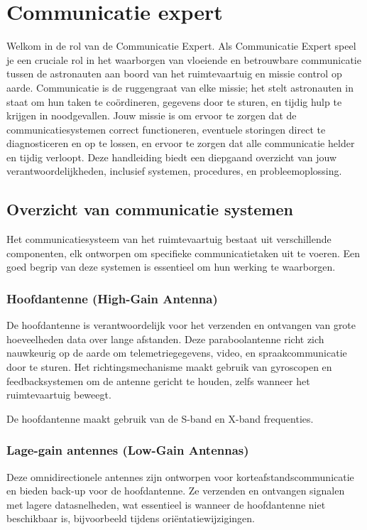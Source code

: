 \section{Communicatie expert}

Welkom in de rol van de Communicatie Expert. Als Communicatie Expert speel je een cruciale rol in het waarborgen van vloeiende en betrouwbare communicatie tussen de astronauten aan boord van het ruimtevaartuig en missie control op aarde. Communicatie is de ruggengraat van elke missie; het stelt astronauten in staat om hun taken te coördineren, gegevens door te sturen, en tijdig hulp te krijgen in noodgevallen. Jouw missie is om ervoor te zorgen dat de communicatiesystemen correct functioneren, eventuele storingen direct te diagnosticeren en op te lossen, en ervoor te zorgen dat alle communicatie helder en tijdig verloopt. Deze handleiding biedt een diepgaand overzicht van jouw verantwoordelijkheden, inclusief systemen, procedures, en probleemoplossing.

\subsection{Overzicht van communicatie systemen}
Het communicatiesysteem van het ruimtevaartuig bestaat uit verschillende componenten, elk ontworpen om specifieke communicatietaken uit te voeren. Een goed begrip van deze systemen is essentieel om hun werking te waarborgen.

\subsubsection{Hoofdantenne (High-Gain Antenna)}
De hoofdantenne is verantwoordelijk voor het verzenden en ontvangen van grote hoeveelheden data over lange afstanden. Deze paraboolantenne richt zich nauwkeurig op de aarde om telemetriegegevens, video, en spraakcommunicatie door te sturen. Het richtingsmechanisme maakt gebruik van gyroscopen en feedbacksystemen om de antenne gericht te houden, zelfs wanneer het ruimtevaartuig beweegt.

De hoofdantenne maakt gebruik van de S-band en X-band frequenties.

\subsubsection{Lage-gain antennes (Low-Gain Antennas)}
Deze omnidirectionele antennes zijn ontworpen voor korteafstandscommunicatie en bieden back-up voor de hoofdantenne. Ze verzenden en ontvangen signalen met lagere datasnelheden, wat essentieel is wanneer de hoofdantenne niet beschikbaar is, bijvoorbeeld tijdens oriëntatiewijzigingen.

